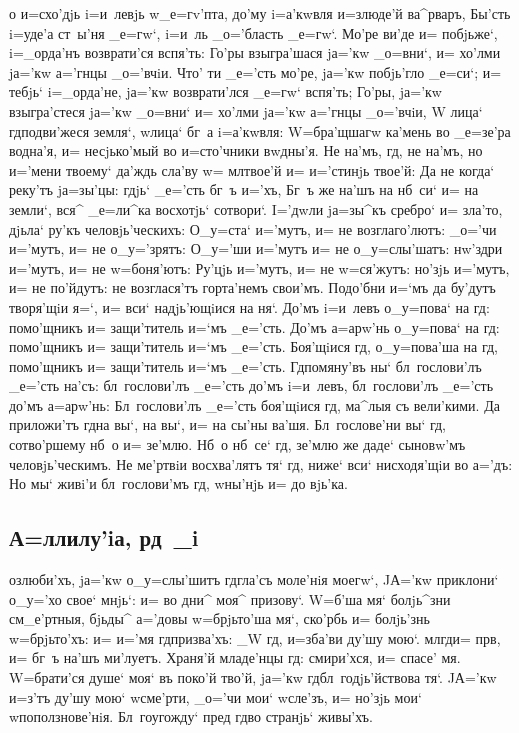\documentclass[12pt,a6paper,twoside,dvips,civil=antiqua,cs=pochaev]{hipbook}
\begin{document}
о и=схо'дjь i=и~левjь w\т _е=гv'пта, до'му i=а'\-кwв\-ля и=з\ъ люде'й
ва^рваръ, Бы'сть i=уде'а ст~ы'ня _е=гw`, i=и~ль _о='бласть _е=гw`. Мо'ре ви'де
и= по\-бjь\-же`, i=_орда'нъ возврати'ся вспя'ть: Го'ры взыгра'шася jа='кw _о=вни`,
и= хо'лми jа='кw а='гнцы _о='вчiи. Что' ти _е='сть мо'ре, jа='кw побjь'гло
_е=си`; и= тебjь` i=_орда'не, jа='кw возврати'лся _е=гw` вспя'ть; Го'ры,
jа='кw взыгра'стеся jа='кw _о=вни` и= хо'лми jа='кw а='гнцы _о='вчiи, W\т
лица` гд по\-дви'\-же\-ся земля`, w\т лица` бг~а i=а'кwвля: W=бра'щ\-ша\-гw ка'мень
во _е=зе'ра водна'я, и= не\-сjь\-ко'\-мый во и=сто'чники вwдны'я. Не на'мъ, гд,
не на'мъ, но и='мени твоему` да'ждь сла'ву w= мл твое'й и= и='стинjь
твое'й: Да не когда` реку'тъ jа=зы'цы: гдjь` _е='сть бг~ъ и='хъ, Бг~ъ же на'шъ
на нб~си` и= на земли`, вся^ _е=ли^\-ка восхотjь` сотвори`. I='дwли jа=зы^къ
сребро` и= зла'то, дjьла` ру'къ человjь'ческихъ: О_у=ста` и='мутъ, и= не
возглаго'лютъ: _о='чи и='мутъ, и= не о_у='зрятъ: О_у='ши и='мутъ и= не
о_у=слы'шатъ: нw'зд\-ри и='мутъ, и= не w=боня'ютъ: Ру'цjь и='мутъ, и= не
w=ся'жутъ: но'зjь и='мутъ, и= не по'йдутъ: не воз\-гла\-ся'тъ горта'немъ
сво\-и'мъ. Подо'бни и=`мъ да бу'\-дутъ творя'щiи я=`, и= вси` надjь'ющiися на
ня`. До'мъ i=и~левъ о_у=\-по\-ва` на гд: по\-мо'щ\-никъ и= защи'титель и=`мъ
_е='сть. До'мъ а=арw'нь о_у=пова` на гд: помо'щникъ и= защи'титель и=`мъ
_е='сть. Боя'щiися гд, о_у=пова'ша на гд, помо'щникъ и= защи'титель
и=`мъ _е='сть. Гд помяну'въ ны` бл~гослови'лъ _е='сть на'съ: бл~го\-сло\-ви'лъ
_е='сть до'мъ i=и~левъ, бл~го\-сло\-ви'лъ _е='сть до'мъ а=арw'нь: Бл~гослови'лъ
_е='сть боя'щiися гд, ма^\-лыя съ вели'кими. Да приложи'тъ гд на вы`, на
вы`, и= на сы'ны ва'шя. Бл~гослове'ни вы` гд, сотво'ршему нб~о и=
зе'м\-лю. Нб~о нб~се` гд, зе'млю же даде` сы\-но\-вw'мъ че\-ло\-вjь'\-че\-скимъ. Не
ме'ртвiи вос\-хва'\-лятъ тя` гд, ниже` вси` нисходя'щiи во а='дъ: Но мы` живi'и
бл~гослови'мъ гд, w\т ны'нjь и= до вjь'ка.

\delimpict

\subsection{А=ллилу'iа, рд~_i}

озлюби'хъ, jа='кw о_у=слы'шитъ гд гла'съ мо\-ле'\-нiя моегw`, JА='кw
приклони` о_у='хо свое` мнjь`: и= во дни^ моя^ призову`. W=б'ша мя`
бо\-лjь^з\-ни см_е'ртныя, бjьды^ а='довы w=брjьто'ша мя`, ско'рбь и= болjь'знь
w=брjьто'хъ: и= и='мя гд призва'хъ: _W гд, и=зба'ви ду'шу
мою`. мл гд и= прв, и= бг~ъ на'шъ ми'луетъ. Храня'й младе'нцы
гд: смири'хся, и= спасе' мя. W=брати'ся душе` моя` въ поко'й тво'й, jа='кw
гд бл~годjь'йствова тя`. JА='кw и=з'тъ ду'шу мою` w\т сме'рти, _о='чи
мои` w\т сле'зъ, и= но'зjь мои` w\т поползнове'нiя. Бл~гоугожду` пред\ъ
гд во странjь` живы'хъ.
\end{document}
